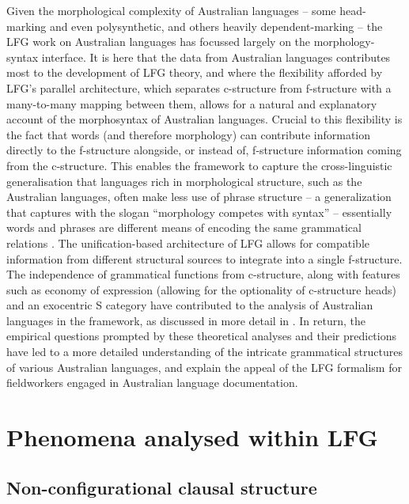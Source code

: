 \documentclass[output=paper,hidelinks]{langscibook}
\begin{document}
\largerpage[-3]
Given the morphological complexity of Australian languages -- some head-marking and even polysynthetic, and others heavily dependent-marking -- the LFG work on Australian languages has focussed largely on the morphology-syntax interface. It is here that the data from Australian languages contributes most to the development of LFG theory, and where the flexibility afforded by LFG's parallel architecture, which separates c-structure from f-structure with a many-to-many mapping between them, allows for a natural and explanatory account of the morphosyntax of Australian languages. Crucial to this flexibility is the fact that words (and therefore morphology) can contribute information directly to the f-structure alongside, or instead of, f-structure information coming from the c-structure.  This enables the framework to capture the cross-linguistic generalisation that languages rich in morphological structure, such as the Australian languages, often make less use of phrase structure -- a generalization that \citet[7]{bresnan2001lexical} captures with the slogan ``morphology competes with syntax'' -- essentially words and phrases are different means of encoding the same grammatical relations \citep{NordBres2011}.  The unification-based architecture of LFG allows for compatible information from different structural sources to integrate into a single f-structure. The independence of grammatical functions from c-structure, along with features such as economy of expression (allowing for the optionality of c-structure heads) and an exocentric S category have contributed to the analysis of Australian languages in the framework, as discussed in more detail in . In return, the empirical questions prompted by these theoretical analyses and their predictions have led to a more detailed understanding of the intricate grammatical structures of various Australian languages, and explain the appeal of the LFG formalism for fieldworkers engaged in Australian language documentation.


\section{Phenomena analysed within LFG}
\label{sec:Australian:phenomena}

\subsection{Non-configurational clausal structure}
\label{sec:nonconfig}
\end{document}
